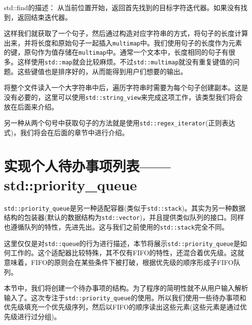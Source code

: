\begin{myQuote}
std::find的描述： 从当前位置开始，返回首先找到的目标字符迭代器。如果没有找到，返回结束迭代器。
\end{myQuote}

这样我们就获取了一个句子，然后通过构造对应字符串的方式，将句子的长度计算出来，并将长度和原始句子一起插入\texttt{multimap}中。我们使用句子的长度作为元素的键，原句作为值存储在\texttt{multimap}中。通常一个文本中，长度相同的句子有很多。这样使用\texttt{std::map}就会比较麻烦。不过\texttt{std::multimap}就没有重复键值的问题。这些键值也是排序好的，从而能得到用户们想要的输出。


将整个文件读入一个大字符串中后，遍历字符串时需要为每个句子创建副本。这是没有必要的，这里可以使用\texttt{std::string\_view}来完成这项工作，该类型我们将会放在后面来介绍。

另一种从两个句号中获取句子的方法就是使用\texttt{std::regex\_iterator}(正则表达式)，我们将会在后面的章节中进行介绍。


\section{实现个人待办事项列表——std::priority\_queue}

\texttt{std::priority\_queue}是另一种适配容器(类似于\texttt{std::stack})。其实为另一种数据结构的包装器(默认的数据结构为\texttt{std::vector})，并且提供类似队列的接口。同样也遵循队列的特性，先进先出。这与我们之前使用的\texttt{std::stack}完全不同。

这里仅仅是对\texttt{std::queue}的行为进行描述，本节将展示\texttt{std::priority\_queue}是如何工作的。这个适配器比较特殊，其不仅有FIFO的特性，还混合着优先级。这就意味着，FIFO的原则会在某些条件下被打破，根据优先级的顺序形成子FIFO队列。


本节中，我们将创建一个待办事项的结构。为了程序的简明性就不从用户输入解析输入了。这次专注于\texttt{std::priority\_queue}的使用。所以我们使用一些待办事项和优先级填充一个优先级序列，然后以FIFO的顺序读出这些元素(这些元素是通过优先级进行过分组)。


